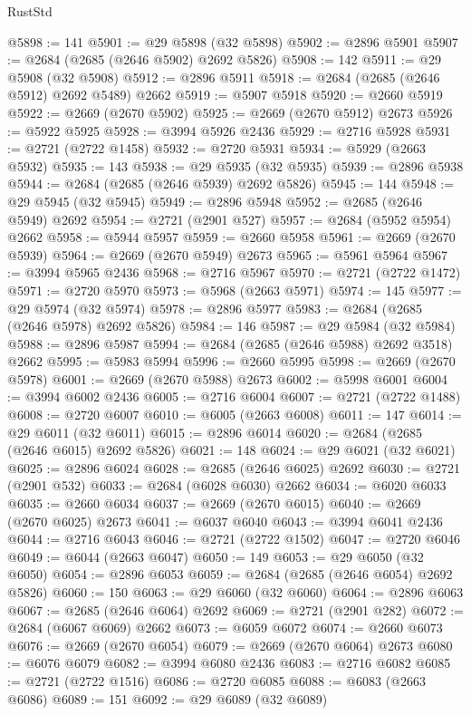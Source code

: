 \begin{lexlean}{RustStd}
\begin{coremodule}
@5898 := 141
@5901 := @29 @5898 (@32 @5898)
@5902 := @2896 @5901
@5907 := @2684 (@2685 (@2646 @5902) @2692 @5826)
@5908 := 142
@5911 := @29 @5908 (@32 @5908)
@5912 := @2896 @5911
@5918 := @2684 (@2685 (@2646 @5912) @2692 @5489) @2662
@5919 := @5907 @5918
@5920 := @2660 @5919
@5922 := @2669 (@2670 @5902)
@5925 := @2669 (@2670 @5912) @2673
@5926 := @5922 @5925
@5928 := @3994 @5926 @2436
@5929 := @2716 @5928
@5931 := @2721 (@2722 @1458)
@5932 := @2720 @5931
@5934 := @5929 (@2663 @5932)
@5935 := 143
@5938 := @29 @5935 (@32 @5935)
@5939 := @2896 @5938
@5944 := @2684 (@2685 (@2646 @5939) @2692 @5826)
@5945 := 144
@5948 := @29 @5945 (@32 @5945)
@5949 := @2896 @5948
@5952 := @2685 (@2646 @5949) @2692
@5954 := @2721 (@2901 @527)
@5957 := @2684 (@5952 @5954) @2662
@5958 := @5944 @5957
@5959 := @2660 @5958
@5961 := @2669 (@2670 @5939)
@5964 := @2669 (@2670 @5949) @2673
@5965 := @5961 @5964
@5967 := @3994 @5965 @2436
@5968 := @2716 @5967
@5970 := @2721 (@2722 @1472)
@5971 := @2720 @5970
@5973 := @5968 (@2663 @5971)
@5974 := 145
@5977 := @29 @5974 (@32 @5974)
@5978 := @2896 @5977
@5983 := @2684 (@2685 (@2646 @5978) @2692 @5826)
@5984 := 146
@5987 := @29 @5984 (@32 @5984)
@5988 := @2896 @5987
@5994 := @2684 (@2685 (@2646 @5988) @2692 @3518) @2662
@5995 := @5983 @5994
@5996 := @2660 @5995
@5998 := @2669 (@2670 @5978)
@6001 := @2669 (@2670 @5988) @2673
@6002 := @5998 @6001
@6004 := @3994 @6002 @2436
@6005 := @2716 @6004
@6007 := @2721 (@2722 @1488)
@6008 := @2720 @6007
@6010 := @6005 (@2663 @6008)
@6011 := 147
@6014 := @29 @6011 (@32 @6011)
@6015 := @2896 @6014
@6020 := @2684 (@2685 (@2646 @6015) @2692 @5826)
@6021 := 148
@6024 := @29 @6021 (@32 @6021)
@6025 := @2896 @6024
@6028 := @2685 (@2646 @6025) @2692
@6030 := @2721 (@2901 @532)
@6033 := @2684 (@6028 @6030) @2662
@6034 := @6020 @6033
@6035 := @2660 @6034
@6037 := @2669 (@2670 @6015)
@6040 := @2669 (@2670 @6025) @2673
@6041 := @6037 @6040
@6043 := @3994 @6041 @2436
@6044 := @2716 @6043
@6046 := @2721 (@2722 @1502)
@6047 := @2720 @6046
@6049 := @6044 (@2663 @6047)
@6050 := 149
@6053 := @29 @6050 (@32 @6050)
@6054 := @2896 @6053
@6059 := @2684 (@2685 (@2646 @6054) @2692 @5826)
@6060 := 150
@6063 := @29 @6060 (@32 @6060)
@6064 := @2896 @6063
@6067 := @2685 (@2646 @6064) @2692
@6069 := @2721 (@2901 @282)
@6072 := @2684 (@6067 @6069) @2662
@6073 := @6059 @6072
@6074 := @2660 @6073
@6076 := @2669 (@2670 @6054)
@6079 := @2669 (@2670 @6064) @2673
@6080 := @6076 @6079
@6082 := @3994 @6080 @2436
@6083 := @2716 @6082
@6085 := @2721 (@2722 @1516)
@6086 := @2720 @6085
@6088 := @6083 (@2663 @6086)
@6089 := 151
@6092 := @29 @6089 (@32 @6089)

\end{coremodule}
\end{lexlean}
